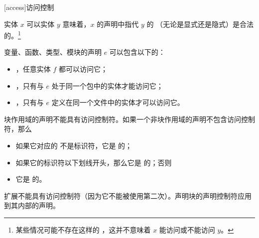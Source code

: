 
[access]{访问控制}

\pnum
实体 $x$ 可以实体 $y$ 意味着，$x$ 的声明中指代 $y$ 的  （无论是显式还是隐式）是合法的。\footnote{某些情况可能不存在这样的 ，这并不意味着 $x$ 能访问或不能访问 $y$。}

\pnum
变量、函数、类型、模块的声明 $e$ 可以包含以下的：

\begin{itemize}
\item {}，任意实体 $f$ 都可以访问它；
\item {}，只有与 $e$ 处于同一个包中的实体才能访问它；
\item {}，只有与 $e$ 定义在同一个文件中的实体才可以访问它。
\end{itemize}

块作用域的声明不能具有访问控制符。如果一个非块作用域的声明不包含访问控制符，那么

\begin{itemize}
\item 如果它对应的  不是标识符，它是  的；
\item 如果它的标识符以下划线开头，那么它是  的；否则
\item 它是  的。
\end{itemize}

扩展不能具有访问控制符（因为它不能被使用第二次）。声明块的声明控制符应用到其内部的声明。
